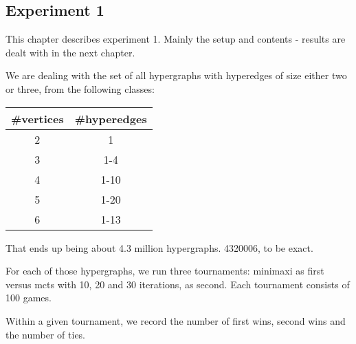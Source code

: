
\subsection{Experiment 1}


This chapter describes experiment 1. Mainly the setup and contents - results are dealt with in the next chapter.

We are dealing with the set of all hypergraphs with hyperedges of size either two or three, from the following classes:

\begin{tabular}{ c | c }
\#vertices & \#hyperedges \\ \hline
2&1 \\ \hline
3&1-4 \\ \hline
4&1-10 \\ \hline
5&1-20 \\ \hline
6&1-13 \\ \hline
\end{tabular}


That ends up being about 4.3 million hypergraphs. 4320006, to be exact.

For each of those hypergraphs, we run three tournaments: minimaxi as first versus mcts with 10, 20 and 30 iterations, as second.
Each tournament consists of 100 games.

Within a given tournament, we record the number of first wins, second wins and the number of ties.
